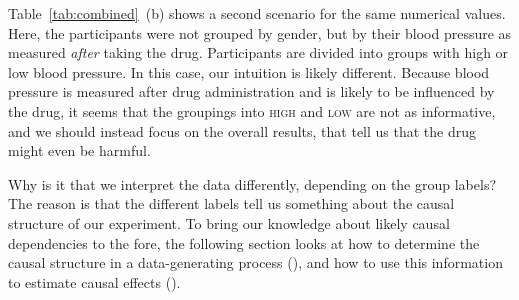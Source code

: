 \documentclass[nobib]{tufte-handout}
\begin{document}
Table~\ref{tab:combined}~(b) shows a second scenario for the same numerical values.
Here, the participants were not grouped by gender, but by their blood pressure as measured \textit{after} taking the drug.
Participants are divided into groups with high or low blood pressure. 
In this case, our intuition is likely different. 
Because blood pressure is measured after drug administration and is likely to be influenced by the drug, it seems that the groupings into \textsc{high} and \textsc{low} are not as informative, and we should instead focus on the overall results, that tell us that the drug might even be harmful.

Why is it that we interpret the data differently, depending on the group labels? 
The reason is that the different labels tell us something about the causal structure of our experiment.
To bring our knowledge about likely causal dependencies to the fore, the following section looks at
how to determine the causal structure in a data-generating process (\textit{}), 
and how to use this information to estimate causal effects (\textit{}).
\end{document}
